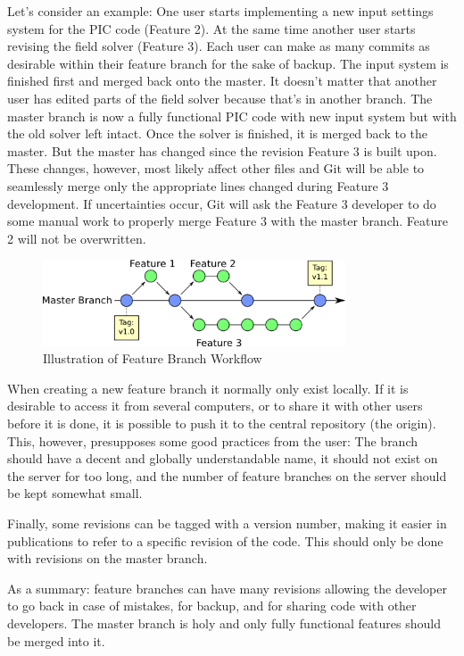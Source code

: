\documentclass[10pt,a4paper]{article}
\begin{document}
Let's consider an example: One user starts implementing a new input settings system for the PIC code (Feature 2). At the same time another user starts revising the field solver (Feature 3). Each user can make as many commits as desirable within their feature branch for the sake of backup. The input system is finished first and merged back onto the master. It doesn't matter that another user has edited parts of the field solver because that's in another branch. The master branch is now a fully functional PIC code with new input system but with the old solver left intact. Once the solver is finished, it is merged back to the master. But the master has changed since the revision Feature 3 is built upon. These changes, however, most likely affect other files and Git will be able to seamlessly merge only the appropriate lines changed during Feature 3 development. If uncertainties occur, Git will ask the Feature 3 developer to do some manual work to properly merge Feature 3 with the master branch. Feature 2 will not be overwritten.

\begin{figure}
	\centering
	\includegraphics[width=0.8\textwidth]{featurebranch.png}
	\caption{Illustration of Feature Branch Workflow}
	\label{fig:featurebranch}
\end{figure}

When creating a new feature branch it normally only exist locally. If it is desirable to access it from several computers, or to share it with other users before it is done, it is possible to push it to the central repository (the origin). This, however, presupposes some good practices from the user: The branch should have a decent and globally understandable name, it should not exist on the server for too long, and the number of feature branches on the server should be kept somewhat small.

Finally, some revisions can be tagged with a version number, making it easier in publications to refer to a specific revision of the code. This should only be done with revisions on the master branch.

As a summary: feature branches can have many revisions allowing the developer to go back in case of mistakes, for backup, and for sharing code with other developers. The master branch is holy and only fully functional features should be merged into it.
\end{document}
